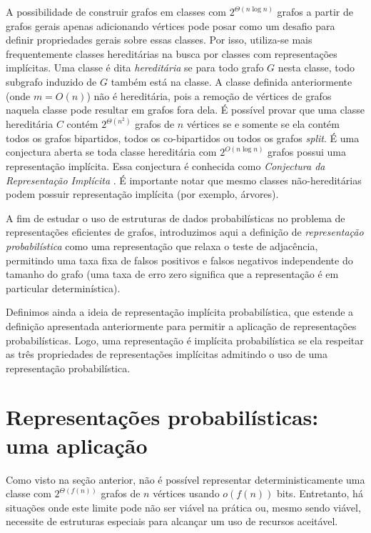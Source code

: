 A possibilidade de construir grafos em classes com $2^{\Theta(n\log n)}$ grafos a partir de grafos gerais apenas adicionando vértices pode posar como um desafio para definir propriedades gerais sobre essas classes. Por isso, utiliza-se mais frequentemente classes hereditárias na busca por classes com representações implícitas. Uma classe é dita \emph{hereditária} se para todo grafo $G$ nesta classe, todo subgrafo induzido de $G$ também está na classe. A classe definida anteriormente (onde $m = O(n)$) não é hereditária, pois a remoção de vértices de grafos naquela classe pode resultar em grafos fora dela. É possível provar que uma classe hereditária $C$ contém $2^{\Theta(n^2)}$ grafos de $n$ vértices se e somente se ela contém todos os grafos bipartidos, todos os co-bipartidos ou todos os grafos \emph{split}. É uma conjectura aberta se toda classe hereditária com $2^{O(n \log n)}$ grafos possui uma representação implícita. Essa conjectura é conhecida como \emph{Conjectura da Representação Implícita} \cite{kannan1992implicat,spinrad2003efficient,chandoo2016implicit}. É importante notar que mesmo classes não-hereditárias podem possuir representação implícita (por exemplo, árvores).

A fim de estudar o uso de estruturas de dados probabilísticas no problema de representações eficientes de grafos, introduzimos aqui a definição de \emph{representação probabilística} como uma representação que relaxa o teste de adjacência, permitindo uma taxa fixa de falsos positivos e falsos negativos independente do tamanho do grafo (uma taxa de erro zero significa que a representação é em particular determinística).

Definimos ainda a ideia de representação implícita probabilística, que estende a definição apresentada anteriormente para permitir a aplicação de representações probabilísticas. Logo, uma representação é implícita probabilística se ela respeitar as três propriedades de representações implícitas admitindo o uso de uma representação probabilística.

\section{Representações probabilísticas: uma aplicação}\label{sec:graphs:example}

Como visto na seção anterior, não é possível representar deterministicamente uma classe com $2^{\Theta(f(n))}$ grafos de $n$ vértices usando $o(f(n))$ bits. Entretanto, há situações onde este limite pode não ser viável na prática ou, mesmo sendo viável, necessite de estruturas especiais para alcançar um uso de recursos aceitável.

